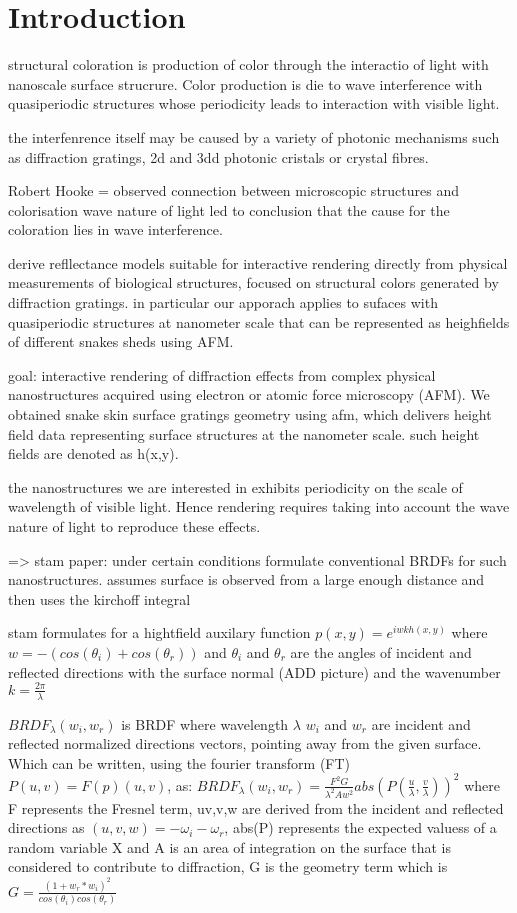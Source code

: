\section{Introduction}

structural coloration is production of color through the interactio of light with nanoscale surface strucrure. Color production is die to wave interference with quasiperiodic structures whose periodicity leads to interaction with visible light.

the interfenrence itself may be  caused by a variety of photonic mechanisms such as diffraction gratings, 2d and 3dd photonic cristals or crystal fibres.


Robert Hooke = observed connection between microscopic structures and colorisation
wave nature of light led to conclusion that the cause for the coloration lies in wave interference.

derive refllectance models suitable for interactive rendering directly from physical measurements of biological structures, focused on structural colors generated by diffraction gratings. in particular our apporach applies to sufaces with quasiperiodic structures at nanometer scale that can be represented as heighfields of different snakes sheds using AFM.

goal: interactive rendering of diffraction effects from complex physical nanostructures acquired using electron or atomic force microscopy (AFM). We obtained snake skin surface gratings geometry using afm, which delivers height field data representing surface structures at the nanometer scale. such height fields are denoted as h(x,y).

the nanostructures we are interested in exhibits periodicity on the scale of wavelength of visible light. Hence rendering requires taking into account the wave nature of light to reproduce these effects.

=> stam paper:
under certain conditions formulate conventional BRDFs for such nanostructures. assumes surface is observed from a large enough distance and then uses the kirchoff integral 

stam formulates for a hightfield auxilary function $p(x,y) = e^{iwkh(x,y)}$ where $w = -(cos(\theta_i)+cos(\theta_r))$ and $\theta_i$ and $\theta_r$ are the angles of incident and reflected directions with the surface normal (ADD picture) and the wavenumber $k=\frac{2\pi}{\lambda}$

$BRDF_{\lambda}(w_i, w_r)$ is BRDF where wavelength $\lambda$ $w_i$ and $w_r$ are incident and reflected normalized directions vectors, pointing away from the given surface. Which can be written, using the fourier transform (FT) $P(u,v) = F(p)(u,v)$, as:
$BRDF_{\lambda}(w_i, w_r) = \frac{F^2 G}{\lambda^2 A w^2}abs(P(\frac{u}{\lambda},\frac{v}{\lambda}))^2$ where F represents the Fresnel term, uv,v,w are derived from the incident and reflected directions as $(u,v,w) = -\omega_i - \omega_r$, abs(P) represents the expected valuess of a random variable X and A is an area of integration on the surface that is considered to contribute to diffraction, G is the geometry term which is $G = \frac{(1+w_r * w_i)^2}{cos(\theta_i)cos(\theta_r)}$


